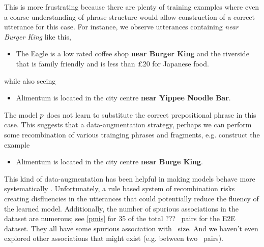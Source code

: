 This is more frustrating because there are plenty of training examples where
even a coarse understanding of phrase structure would allow construction
of a correct utterance for this case.
For instance, we observe utterances containing \textit{near Burger King}
like this,
\begin{itemize}
\item[]The Eagle is a low rated coffee shop \textbf{near Burger King}
and the riverside that is family friendly and is less than £20
for Japanese food.
\end{itemize}
while also seeing
\begin{itemize}
\item[]Alimentum is located in the city centre \textbf{near Yippee Noodle Bar}. \textellipsis
\end{itemize}
The model $p$ does not learn to substitute the correct prepositional
phrase in this case. This suggests that a data-augmentation strategy,
perhaps we can perform some recombination
of various trainging phrases and fragments, e.g. construct the example
\begin{itemize}
\item[]Alimentum is located in the city centre \textbf{near Burge King}. 
\end{itemize}
This kind of data-augmentation has been helpful in making 
models behave more systematically \citep{thethinsg.}. 
Unfortunately, a rule based system of recombination risks creating 
disfluencies in the utterances that could potentially reduce the fluency
of the learned model. Additionally, the number of spurious
associations in the dataset are numerous; see \autoref{pmis} for 35 of the
total ??? \attributevalue~pairs for the E2E dataset. They all have some 
spurious association with \meaningrepresentation~size. And we haven't even
explored other associations that might exist (e.g. between two \attributevalue~pairs).

